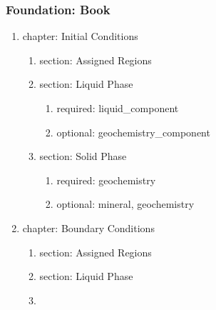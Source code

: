 

\begin{frame}
	\frametitle{Foundation: Book}
	\begin{enumerate}
		\item chapter: Initial Conditions
		\begin{enumerate}
			\item section: Assigned Regions
			\item section: Liquid Phase
			\begin{enumerate}
				\item required: liquid\_component
				\item optional: geochemistry\_component
			\end{enumerate}
			\item section: Solid Phase
			\begin{enumerate}
				\item required: geochemistry
				\item optional: mineral, geochemistry
			\end{enumerate}
		\end{enumerate}
		\item chapter: Boundary Conditions
		\begin{enumerate}
			\item section: Assigned Regions
			\item section: Liquid Phase
			\item {}
		\end{enumerate}
	\end{enumerate}
\end{frame}


